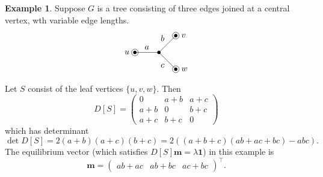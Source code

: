 \documentclass[12pt]{amsart}
\theoremstyle{definition}
\newtheorem{eg}[thm]{Example}
\newcommand{\bone}{\mathbf{1}}
\newcommand{\boldm}{\mathbf{m}}
\newcommand{\tr}{\intercal}
\DeclareMathOperator{\cof}{cof}
\begin{document}


\begin{eg}\label{eg:3-star}
Suppose $G$ is a tree consisting of three edges joined at a central vertex, wth variable edge lengths.
\[
\begin{tikzpicture}
	\coordinate (u) at (-1,0);
	\coordinate (v) at (0.7,0.7);
	\coordinate (w) at (0.7,-0.7);
	\coordinate (o) at (0,0);

	\draw (o) -- node[above] {$a$} (u);
	\draw (v) -- node[above left] {$b$} (o)
		-- node[below left] {$c$} (w);

	\foreach \c in {u, v, w, o} {
		\fill (\c) circle (2pt);
	}
	\foreach \c in {u, v, w} {
		\draw (\c) circle (4pt);
	}
	
	\node[left=3pt] at (u) {$u$};
	\node[right=3pt] at (v) {$v$};
	\node[right=3pt] at (w) {$w$};
\end{tikzpicture}
\]
Let $S$ consist of the leaf vertices $ \{u,v,w\}$.
Then 
\[
	D[S] = \begin{pmatrix}
	0 & a + b & a + c \\
	a + b & 0 & b + c \\
	a + c & b + c & 0
	\end{pmatrix}
\]
which has determinant
\[\det D[S] = 2(a+b)(a+c)(b+c) 
	= 2\left( (a+b+c)(ab + ac + bc) - abc \right).
\]
The equilibrium vector (which satisfies $D[S] \boldm = \lambda \bone$) in this example is 
\[
	\boldm = \begin{pmatrix} 
	ab + ac & 
	ab + bc &
	ac + bc 
	\end{pmatrix}^\tr.
\]
\end{eg}
\end{document}
